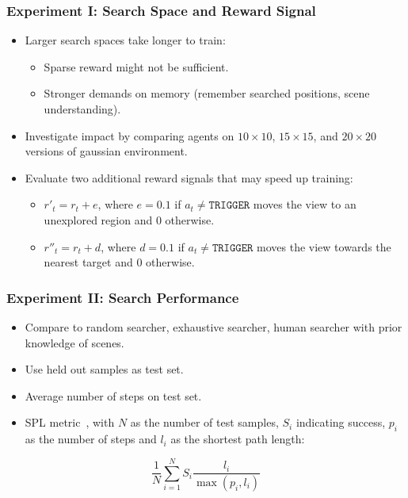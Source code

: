 \begin{frame}
    \frametitle{Experiment I: Search Space and Reward Signal}

    \begin{itemize}
        \item Larger search spaces take longer to train:
        \begin{itemize}
            \item Sparse reward might not be sufficient.
            \item Stronger demands on memory (remember searched positions, scene understanding).
        \end{itemize}
        \item Investigate impact by comparing agents on \(10 \times 10\), \(15 \times 15\), and \(20 \times 20\) versions of gaussian environment.
        \item Evaluate two additional reward signals that may speed up training:
        \begin{itemize}
            \item \(r'_t = r_t + e\), where \(e=0.1\) if \(a_t \neq \mathtt{TRIGGER}\) moves the view to an unexplored region and \(0\) otherwise.
            \item \(r''_t = r_t + d\), where \(d=0.1\) if \(a_t \neq \mathtt{TRIGGER}\) moves the view towards the nearest target and \(0\) otherwise.
        \end{itemize}
    \end{itemize}
\end{frame}

\begin{frame}
    \frametitle{Experiment II: Search Performance}

    \begin{itemize}
        \item Compare to random searcher, exhaustive searcher, human searcher with prior knowledge of scenes.
        \item Use held out samples as test set.
        \item Average number of steps on test set.
        \item SPL metric~\cite{anderson_evaluation_2018}, with \(N\) as the number of test samples, \(S_i\) indicating success, \(p_i\) as the number of steps and \(l_i\) as the shortest path length:
    \end{itemize}
    \[
        \frac{1}{N} \sum_{i=1}^N S_i \frac{l_i}{\max(p_i,l_i)}
    \]
\end{frame}

